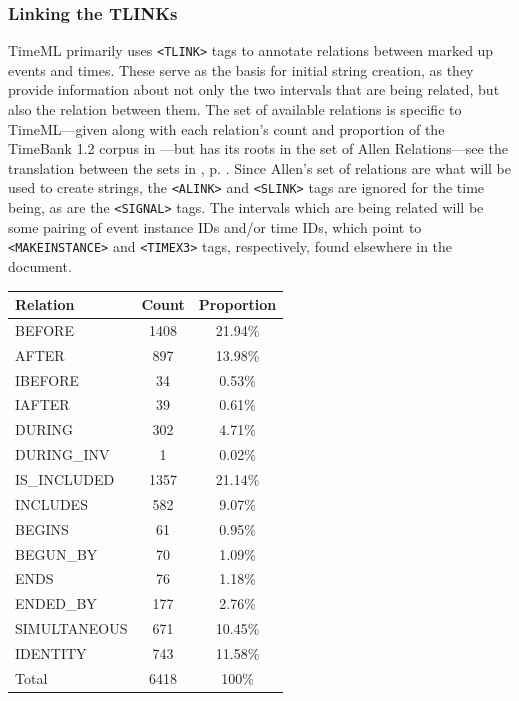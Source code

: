 \documentclass[a4paper,12pt,leqno,twoside]{article}
\begin{document}
\subsubsection{Linking the TLINKs}\label{ssub:tlinks}
TimeML primarily uses \verb|<TLINK>| tags to annotate relations between marked up events and times. These serve as the basis for initial string creation, as they provide information about not only the two intervals that are being related, but also the relation between them. The set of available relations is specific to TimeML---given along with each relation's count and proportion of the TimeBank 1.2 corpus in ---but has its roots in the set of Allen Relations---see the translation between the sets in , p. \pageref{fig:tlink-allen-translation}. Since Allen's set of relations are what will be used to create strings, the \verb|<ALINK>| and \verb|<SLINK>| tags are ignored for the time being, as are the \verb|<SIGNAL>| tags. The intervals which are being related will be some pairing of event instance IDs and/or time IDs, which point to \verb|<MAKEINSTANCE>| and \verb|<TIMEX3>| tags, respectively, found elsewhere in the document.
\begin{center}
	\begin{tabular}[h!]{| l c c |}
		\hline
		\textbf{Relation} & \textbf{Count} & \textbf{Proportion}\\
		\hline
		BEFORE & 1408 & 21.94\%\\
		AFTER & 897 & 13.98\%\\
		IBEFORE & 34 & 0.53\%\\
		IAFTER & 39 & 0.61\%\\
		DURING & 302 & 4.71\%\\
		DURING\_INV & 1 & 0.02\%\\
		IS\_INCLUDED & 1357 & 21.14\%\\
		INCLUDES & 582 & 9.07\%\\
		BEGINS & 61 & 0.95\%\\
		BEGUN\_BY & 70 & 1.09\%\\
		ENDS & 76 & 1.18\%\\
		ENDED\_BY & 177 & 2.76\%\\
		SIMULTANEOUS & 671 & 10.45\%\\
		IDENTITY & 743 & 11.58\%\\
		\hline
		Total & 6418 & 100\%\\
		\hline
	\end{tabular}
	\label{tab:timeml-relation-counts}
\end{center}
\end{document}
